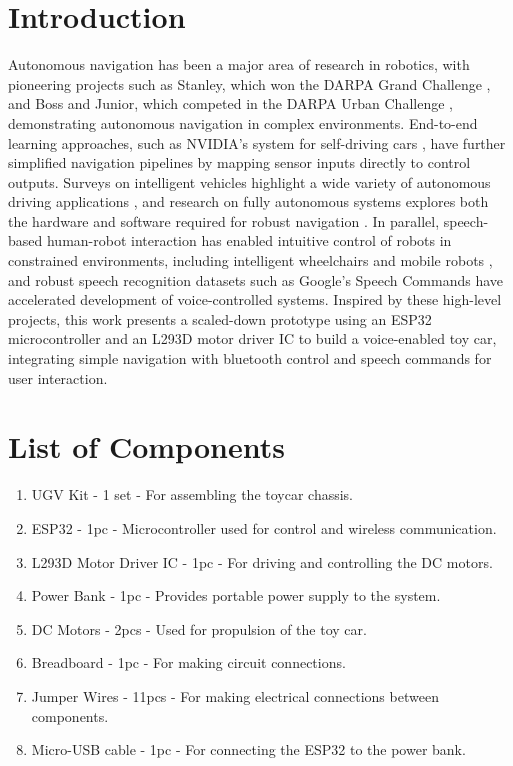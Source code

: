\documentclass[conference]{IEEEtran}
\begin{document}
\section{Introduction}
Autonomous navigation has been a major area of research in robotics, with pioneering projects such as Stanley, which won the DARPA Grand Challenge \cite{thrun2006stanley}, and Boss and Junior, which competed in the DARPA Urban Challenge \cite{urmson2008boss, montemerlo2008junior}, demonstrating autonomous navigation in complex environments. End-to-end learning approaches, such as NVIDIA's system for self-driving cars \cite{bojarski2016end}, have further simplified navigation pipelines by mapping sensor inputs directly to control outputs. Surveys on intelligent vehicles highlight a wide variety of autonomous driving applications \cite{bishop2000survey}, and research on fully autonomous systems explores both the hardware and software required for robust navigation \cite{levinson2011towards}. In parallel, speech-based human-robot interaction has enabled intuitive control of robots in constrained environments, including intelligent wheelchairs and mobile robots \cite{li2017speech, prasad2013voice, vasudevan2010speech}, and robust speech recognition datasets such as Google’s Speech Commands \cite{warden2018speech} have accelerated development of voice-controlled systems. Inspired by these high-level projects, this work presents a scaled-down prototype using an ESP32 microcontroller and an L293D motor driver IC to build a voice-enabled toy car, integrating simple navigation with bluetooth control and speech commands for user interaction.

\section{List of Components}
\begin{enumerate}[label=\thesection.\arabic*,ref=\thesection.\theenumi]

\item UGV Kit - 1 set - For assembling the toycar chassis.

\item ESP32 - 1pc - Microcontroller used for control and wireless communication.

\item L293D Motor Driver IC - 1pc - For driving and controlling the DC motors.

\item Power Bank - 1pc - Provides portable power supply to the system.

\item DC Motors - 2pcs - Used for propulsion of the toy car.

\item Breadboard - 1pc - For making circuit connections. 

\item Jumper Wires - 11pcs - For making electrical connections between components.

\item Micro-USB cable - 1pc - For connecting the ESP32 to the power bank.
\end{enumerate}
\end{document}
